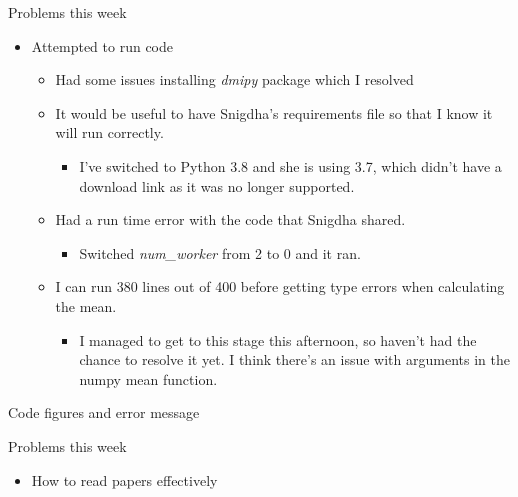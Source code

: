 \documentclass{beamer}
\begin{document}
\begin{frame}{Problems this week}
\begin{itemize}
    \item Attempted to run code
    \begin{itemize}
        \item Had some issues installing \emph{dmipy} package which I resolved
        \item It would be useful to have Snigdha's requirements file so that I know it will run correctly.
        \begin{itemize}
            \item I've switched to Python 3.8 and she is using 3.7, which didn't have a download link as it was no longer supported.
        \end{itemize}
        \item Had a run time error with the code that Snigdha shared.
            \begin{itemize}
                \item Switched \emph{num\_worker} from 2 to 0 and it ran. 
            \end{itemize}
        \item I can run 380 lines out of 400 before getting type errors when calculating the mean.
        \begin{itemize}
            \item I managed to get to this stage this afternoon, so haven't had the chance to resolve it yet. I think there's an issue with arguments in the numpy mean function.
        \end{itemize}
        \end{itemize}
    \end{itemize}
\end{frame}

\begin{frame}{Code figures and error message}

\end{frame}

\begin{frame}{Problems this week}
        \begin{itemize}
        \item How to read papers effectively
        \end{itemize}
\end{frame}
\end{document}
